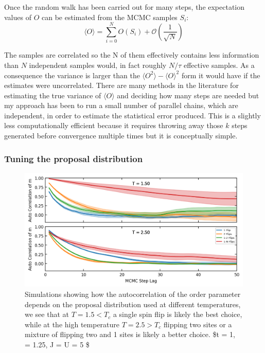 Once the random walk has been carried out for many steps, the expectation values of \(O\) can be estimated from the MCMC samples \(S_i\): \[
    \langle O \rangle = \sum_{i = 0}^{N} O(S_i) + \mathcal{O}(\frac{1}{\sqrt{N}})
\]

The samples are correlated so the N of them effectively contains less information than \(N\) independent samples would, in fact roughly \(N/\tau\) effective samples. As a consequence the variance is larger than the \(\langle O^2 \rangle - \langle O \rangle ^2\) form it would have if the estimates were uncorrelated. There are many methods in the literature for estimating the true variance of \(\langle O \rangle\) and deciding how many steps are needed but my approach has been to run a small number of parallel chains, which are independent, in order to estimate the statistical error produced. This is a slightly less computationally efficient because it requires throwing away those \(k\) steps generated before convergence multiple times but it is conceptually simple.

\hypertarget{tuning-the-proposal-distribution}{%
\subsubsection{Tuning the proposal distribution}\label{tuning-the-proposal-distribution}}

\hypertarget{fig:autocorr_multiple_proposals}{%
\begin{figure}
\centering
\includegraphics[width=1\textwidth,height=\textheight]{figure_code/fk_chapter/lsr/figs/autocorr_multiple_proposals.png}
\caption[{Comparison of different proposal distributions}]{Simulations showing how the autocorrelation of the order parameter depends on the proposal distribution used at different temperatures, we see that at \(T = 1.5 < T_c\) a single spin flip is likely the best choice, while at the high temperature \(T = 2.5 > T_c\) flipping two sites or a mixture of flipping two and 1 sites is likely a better choice. \$t = 1, \alpha = 1.25, J = U = 5 \$}
\label{fig:autocorr_multiple_proposals}
\end{figure}
}

